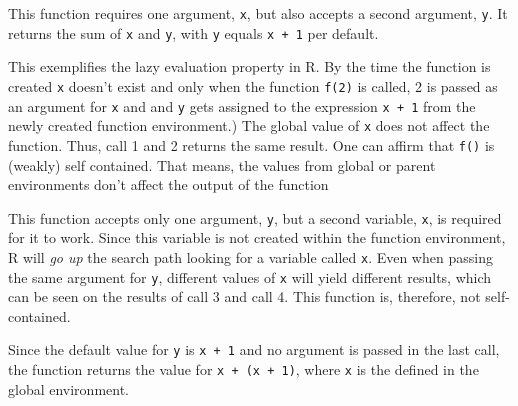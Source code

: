 \documentclass[12,]{article}
\providecommand{\tightlist}{%
  \setlength{\itemsep}{0pt}\setlength{\parskip}{0pt}}
\begin{document}
\begin{description}
\tightlist
\item[Call 1 and 2]
This function requires one argument, \texttt{x}, but also accepts a
second argument, \texttt{y}. It returns the sum of \texttt{x} and
\texttt{y}, with \texttt{y} equals \texttt{x\ +\ 1} per default.

This exemplifies the lazy evaluation property in R. By the time the
function is created \texttt{x} doesn't exist and only when the function
\texttt{f(2)} is called, 2 is passed as an argument for \texttt{x} and
and \texttt{y} gets assigned to the expression \texttt{x\ +\ 1} from the
newly created function environment.) The global value of \texttt{x} does
not affect the function. Thus, call 1 and 2 returns the same result. One
can affirm that \texttt{f()} is (weakly) self contained. That means, the
values from global or parent environments don't affect the output of the
function
\item[Call 3 and 4]
This function accepts only one argument, \texttt{y}, but a second
variable, \texttt{x}, is required for it to work. Since this variable is
not created within the function environment, R will \emph{go up} the
search path looking for a variable called \texttt{x}. Even when passing
the same argument for \texttt{y}, different values of \texttt{x} will
yield different results, which can be seen on the results of call 3 and
call 4. This function is, therefore, not self-contained.
\item[Call 5]
Since the default value for \texttt{y} is \texttt{x\ +\ 1} and no
argument is passed in the last call, the function returns the value for
\texttt{x\ +\ (x\ +\ 1)}, where \texttt{x} is the defined in the global
environment.
\end{description}
\end{document}

